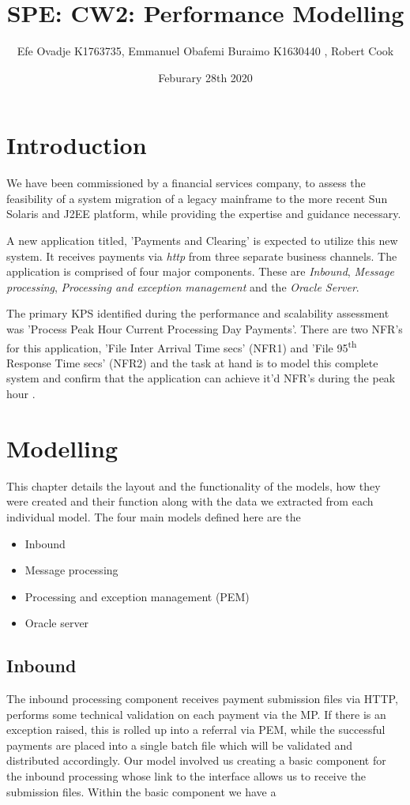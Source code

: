 \documentclass[a4paper,11pt]{report}
\title{SPE: CW2: Performance Modelling}
\author{Efe Ovadje K1763735, {Emmanuel Obafemi Buraimo K1630440 , Robert Cook  }}
\date{Feburary 28th 2020}
\begin{document}
\maketitle

\chapter*{Introduction}
We have been commissioned
by a financial services company,
to assess the feasibility of a system migration of a
legacy mainframe to the more recent Sun Solaris and
J2EE platform, while providing the expertise and guidance necessary.

A new application titled, 'Payments and Clearing' is expected to
utilize this new system.
It receives payments via \textit{http} from three separate business channels.
The application is comprised of four major components.
These are \textit{Inbound}, \textit{Message processing},
\textit{Processing and exception management} and the \textit{Oracle Server}.

The primary KPS identified during the performance and
scalability assessment was 'Process Peak Hour Current Processing Day Payments'.
There are two NFR's for this application,
'File Inter Arrival Time secs' (NFR1) and
'File 95\textsuperscript{th} Response Time secs' (NFR2) and the task at hand is to model this complete system and confirm that the application can achieve it'd NFR's during the peak hour .

\chapter*{Modelling}
This chapter details the layout and the functionality of the models, how they were created and their function along with the data we extracted from each individual model. The four main models defined here are the 
\begin{itemize}
  \item Inbound
  
  \item Message processing
  
  
  \item Processing and exception management (PEM)
  \item Oracle server
\end{itemize}


\section*{Inbound}
The inbound processing component receives payment submission files via HTTP, performs some technical validation on each payment via the MP. If there is an exception raised, this is rolled up into a referral via PEM, while the successful payments are placed into a single batch file which will be validated and distributed accordingly. Our model involved us creating a basic component for the inbound processing whose link to the interface allows us to receive the submission files. Within the basic component we have a 
\end{document}
